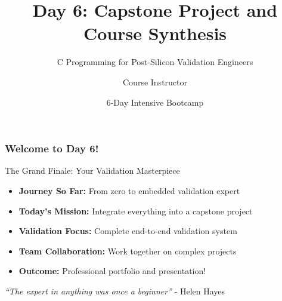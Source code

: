 \documentclass{beamer}
\title{Day 6: Capstone Project and Course Synthesis}
\subtitle{C Programming for Post-Silicon Validation Engineers}
\author{Course Instructor}
\date{6-Day Intensive Bootcamp}
\institute{Post-Silicon Validation Training Program}
\begin{document}
\frame{\titlepage}

\begin{frame}
\frametitle{Welcome to Day 6!}
\begin{center}
\Large The Grand Finale: Your Validation Masterpiece
\end{center}

\begin{itemize}
    \item \textbf{Journey So Far:} From zero to embedded validation expert
    \item \textbf{Today's Mission:} Integrate everything into a capstone project
    \item \textbf{Validation Focus:} Complete end-to-end validation system
    \item \textbf{Team Collaboration:} Work together on complex projects
    \item \textbf{Outcome:} Professional portfolio and presentation!
\end{itemize}

\vspace{0.5cm}
\begin{center}
\textit{``The expert in anything was once a beginner''} - Helen Hayes
\end{center}
\end{frame}
\end{document}
